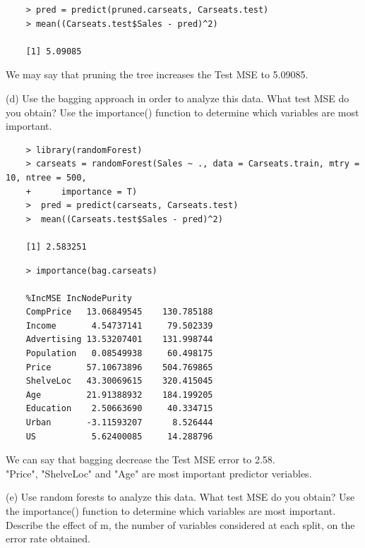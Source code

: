 \documentclass{article}
\begin{document}
\begin{program}
	\begin{verbatim}
	> pred = predict(pruned.carseats, Carseats.test)
	> mean((Carseats.test$Sales - pred)^2)
	
	[1] 5.09085
	\end{verbatim}
\end{program}

We may say that pruning the tree increases the Test MSE to 5.09085.



\newpage

(d) Use the bagging approach in order to analyze this data. What test MSE do you obtain? Use the importance() function to determine which variables are most important.\\

\begin{program}
	\begin{verbatim}
	> library(randomForest)
	> carseats = randomForest(Sales ~ ., data = Carseats.train, mtry = 10, ntree = 500,
	+      importance = T)
	>  pred = predict(carseats, Carseats.test)
	>  mean((Carseats.test$Sales - pred)^2)
	
	[1] 2.583251
	\end{verbatim}
\end{program}


\begin{program}
	\begin{verbatim}
	> importance(bag.carseats)
	
	%IncMSE IncNodePurity
	CompPrice   13.06849545    130.785188
	Income       4.54737141     79.502339
	Advertising 13.53207401    131.998744
	Population   0.08549938     60.498175
	Price       57.10673896    504.769865
	ShelveLoc   43.30069615    320.415045
	Age         21.91388932    184.199205
	Education    2.50663690     40.334715
	Urban       -3.11593207      8.526444
	US           5.62400085     14.288796
	\end{verbatim}
\end{program}

We can say that bagging decrease the Test MSE error to 2.58.\\

"Price", "ShelveLoc" and "Age" are most important predictor veriables.
 
\newpage

(e) Use random forests to analyze this data. What test MSE do you obtain? Use the importance() function to determine which variables are most important. Describe the effect of m, the number of variables considered at each split, on the error rate obtained.
\end{document}
